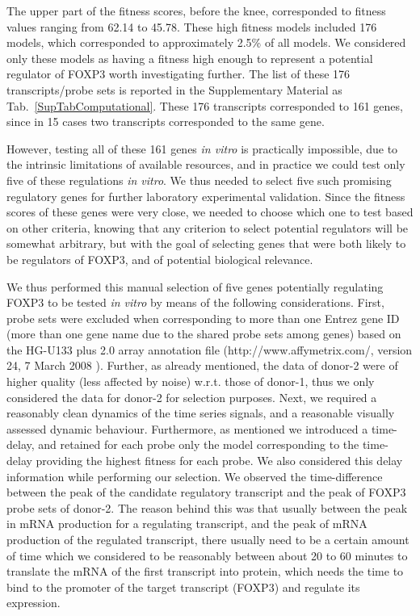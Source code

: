 \documentclass[oneside, 10pt, a4paper, twocolumn]{article}
\begin{document}
{The upper part of the fitness scores, before the knee, corresponded to fitness values ranging from 62.14 to 45.78. These high fitness models included 176 models, which corresponded to approximately 2.5\% of all models. We considered only these models as having a fitness high enough to represent a potential regulator of FOXP3 worth investigating further. The list of these 176 transcripts/probe sets is reported in the Supplementary Material as Tab.~\ref{SupTabComputational}. These 176 transcripts corresponded to 161 genes, since in 15 cases two transcripts corresponded to the same gene.

However, testing all of these 161 genes \textit{in vitro} %
is practically impossible, due to the intrinsic limitations of available resources, and in practice we could test only five of these regulations \textit{in vitro}. We thus needed to select five such promising regulatory genes for further laboratory experimental validation. Since the fitness scores of these genes were very close, we needed to choose which one to test based on other criteria, knowing that any criterion to select potential regulators will be somewhat arbitrary, but with the goal of selecting genes that were both likely to be regulators of FOXP3, and of potential biological relevance.

We thus performed this manual selection of five genes potentially regulating FOXP3 to be tested \textit{in vitro} by means of the following considerations. First, probe sets were excluded when corresponding to more than one Entrez gene ID (more than one gene name due to the shared probe sets among genes) based on the HG-U133 plus 2.0 array annotation file (http://www.affymetrix.com/, version 24, 7 March 2008 \citep{he2012plau}). Further, as already mentioned, the data of donor-2 were of higher quality (less affected by noise) w.r.t. those of donor-1, thus we only considered the data for donor-2 for selection purposes. Next, we required a reasonably clean dynamics of the time series signals, and a reasonable visually assessed dynamic behaviour. Furthermore, as mentioned we introduced a time-delay, and retained for each probe only the model corresponding to the time-delay providing the highest fitness for each probe. We also considered this delay information while performing our selection. We observed the time-difference between the peak of the candidate regulatory transcript and the peak of FOXP3 probe sets of donor-2. The reason behind this was that usually between the peak in mRNA production for a regulating transcript, and the peak of mRNA production of the regulated transcript, there usually need to be a certain amount of time which we considered to be reasonably between about 20 to 60 minutes to translate the mRNA of the first transcript into protein, which needs the time to bind to the promoter of the target transcript (FOXP3) and regulate its expression. 
 
}
\end{document}
